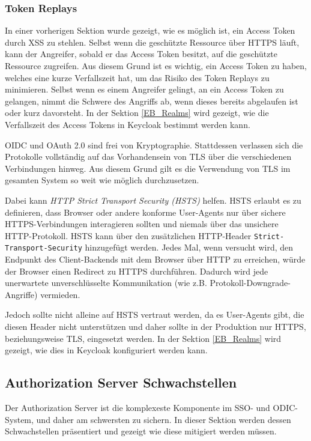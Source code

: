 \subsubsection{Token Replays}

In einer vorherigen Sektion wurde gezeigt, wie es möglich ist, ein Access Token durch XSS zu stehlen. Selbst wenn die geschützte Ressource über HTTPS läuft, kann der Angreifer, sobald er das Access Token besitzt, auf die geschützte Ressource zugreifen. Aus diesem Grund ist es wichtig, ein Access Token zu haben, welches eine kurze Verfallszeit hat, um das Risiko des Token Replays zu minimieren. Selbst wenn es einem Angreifer gelingt, an ein Access Token zu gelangen, nimmt die Schwere des Angriffs ab, wenn dieses bereits abgelaufen ist oder kurz davorsteht. In der Sektion \ref{EB_Realms} wird gezeigt, wie die Verfallszeit des Access Tokens in Keycloak bestimmt werden kann.

OIDC und OAuth 2.0 sind frei von Kryptographie. Stattdessen verlassen sich die Protokolle vollständig auf das Vorhandensein von TLS über die verschiedenen Verbindungen hinweg. Aus diesem Grund gilt es die Verwendung von TLS im gesamten System so weit wie möglich durchzusetzen.

Dabei kann \textit{HTTP Strict Transport Security (HSTS)} helfen. HSTS erlaubt es zu definieren, dass Browser oder andere konforme User-Agents nur über sichere HTTPS-Verbindungen interagieren sollten und niemals über das unsichere HTTP-Protokoll. HSTS kann über den zusätzlichen HTTP-Header \texttt{Strict-Transport-Security} hinzugefügt werden. Jedes Mal, wenn versucht wird, den Endpunkt des Client-Backends mit dem Browser über HTTP zu erreichen, würde der Browser einen Redirect zu HTTPS durchführen. Dadurch wird jede unerwartete unverschlüsselte Kommunikation (wie z.B. Protokoll-Downgrade-Angriffe) vermieden. \cite{SSEB_OAuth2inAction}

Jedoch sollte nicht alleine auf HSTS vertraut werden, da es User-Agents gibt, die diesen Header nicht unterstützen und daher sollte in der Produktion nur HTTPS, beziehungsweise TLS, eingesetzt werden. In der Sektion \ref{EB_Realms} wird gezeigt, wie dies in Keycloak konfiguriert werden kann.

\subsection{Authorization Server Schwachstellen}

Der Authorization Server ist die komplexeste Komponente im SSO- und ODIC-System, und daher am schwersten zu sichern. In dieser Sektion werden dessen Schwachstellen präsentiert und gezeigt wie diese mitigiert werden müssen.

